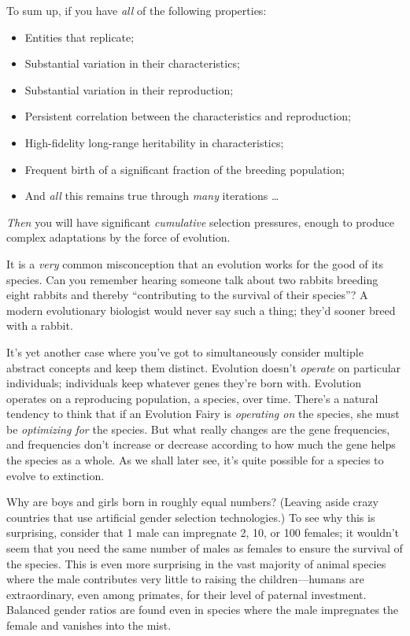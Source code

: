 {
 To sum up, if you have \textit{all} of the following properties:}

\begin{itemize}
\item  Entities that replicate;
\item  Substantial variation in their characteristics;
\item  Substantial variation in their reproduction;
\item Persistent correlation between the characteristics and
reproduction;
\item  High-fidelity long-range heritability in characteristics;
\item  Frequent birth of a significant fraction of the breeding
  population;
\item And \textit{all} this remains true through \textit{many}
  iterations \ldots
\end{itemize}

{
 \textit{Then} you will have significant \textit{cumulative}
selection pressures, enough to produce complex adaptations by the force
of evolution.}

\myendsectiontext


{
 It is a \textit{very} common misconception that an evolution works
for the good of its species. Can you remember hearing someone talk
about two rabbits breeding eight rabbits and thereby
``contributing to the survival of their
species''? A modern evolutionary biologist would
never say such a thing; they'd sooner breed with a
rabbit. }

{
 It's yet another case where you've
got to simultaneously consider multiple abstract concepts and keep them
distinct. Evolution doesn't \textit{operate} on
particular individuals; individuals keep whatever genes
they're born with. Evolution operates on a reproducing
population, a species, over time. There's a natural
tendency to think that if an Evolution Fairy is \textit{operating on}
the species, she must be \textit{optimizing for} the species. But what
really changes are the gene frequencies, and frequencies
don't increase or decrease according to how much the
gene helps the species as a whole. As we shall later see,
it's quite possible for a species to evolve to
extinction.}

{
 Why are boys and girls born in roughly equal numbers? (Leaving
aside crazy countries that use artificial gender selection
technologies.) To see why this is surprising, consider that 1 male can
impregnate 2, 10, or 100 females; it wouldn't seem that
you need the same number of males as females to ensure the survival of
the species. This is even more surprising in the vast majority of
animal species where the male contributes very little to raising the
children---humans are extraordinary, even among primates, for their
level of paternal investment. Balanced gender ratios are found even in
species where the male impregnates the female and vanishes into the
mist.}

